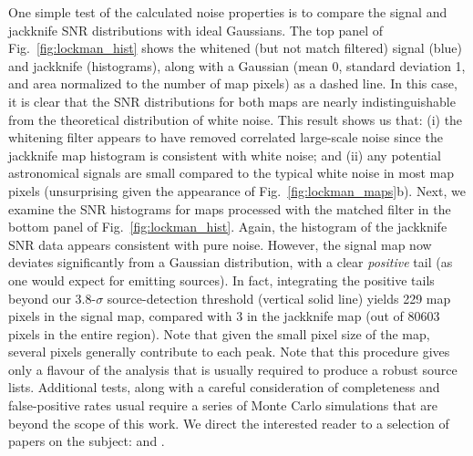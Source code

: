 \documentclass[useAMS,usenatbib,nofootinbib]{mn2e}
\begin{document}
One simple test of the calculated noise properties is to compare the
signal and jackknife SNR distributions with ideal Gaussians. The top
panel of Fig.~\ref{fig:lockman_hist} shows the whitened (but not match
filtered) signal (blue) and jackknife (histograms), along with a
Gaussian (mean 0, standard deviation 1, and area normalized to the
number of map pixels) as a dashed line. In this case, it is clear that
the SNR distributions for both maps are nearly indistinguishable from
the theoretical distribution of white noise. This result shows us
that: (i) the whitening filter appears to have removed correlated
large-scale noise since the jackknife map histogram is consistent with
white noise; and (ii) any potential astronomical signals are small
compared to the typical white noise in most map pixels (unsurprising
given the appearance of Fig.~\ref{fig:lockman_maps}b). Next, we
examine the SNR histograms for maps processed with the matched filter
in the bottom panel of Fig.~\ref{fig:lockman_hist}. Again, the
histogram of the jackknife SNR data appears consistent with pure
noise. However, the signal map now deviates significantly from a
Gaussian distribution, with a clear \emph{positive} tail (as one would
expect for emitting sources). In fact, integrating the positive tails
beyond our 3.8-$\sigma$ source-detection threshold (vertical solid
line) yields 229 map pixels in the signal map, compared with 3 in the
jackknife map (out of 80603 pixels in the entire region). Note that
given the small pixel size of the map, several pixels generally
contribute to each peak. Note that this procedure gives only a flavour
of the analysis that is usually required to produce a robust source
lists. Additional tests, along with a careful consideration of
completeness and false-positive rates usual require a series of Monte
Carlo simulations that are beyond the scope of this work. We direct
the interested reader to a selection of papers on the subject:
\citet{scott2002,coppin2006,perera2008,weiss2009} and
\citet{chapin2011}.
\end{document}
